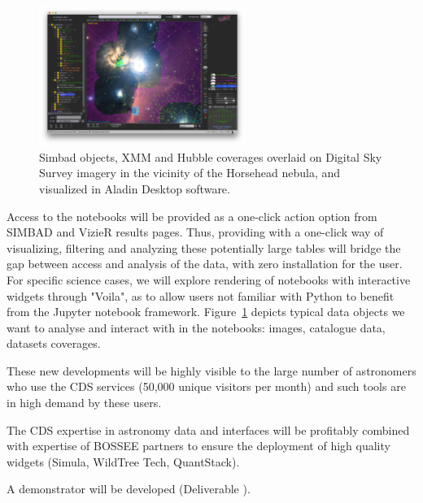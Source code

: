 \begin{task}[
  title=Astronomy application,
  id=astro,
  lead=CDS,
  PM=18,
  wphases={18-42},
  partners={QS,WTT,SRL,INSERM,XFEL}
]
\begin{figure}[ht!]\centering
  \includegraphics[width=0.6\textwidth]{astro-aladin-snapshot}
  \caption{Simbad objects, XMM and Hubble coverages overlaid on Digital Sky Survey imagery in the vicinity of the Horsehead nebula, and visualized in Aladin Desktop software.}\label{fig:astro-aladin-snapshot}
\end{figure}

  Access to the notebooks will be provided as a one-click action option from
  SIMBAD and VizieR results pages.
  Thus, providing with a one-click way of visualizing, filtering and analyzing
these potentially large tables will bridge the gap between access and analysis
of the data, with zero installation for the user.
  For specific science cases, we will explore rendering of notebooks with 
  interactive widgets through "Voila", as to allow users not familiar with 
  Python to benefit from the Jupyter notebook framework.
  Figure~\ref{fig:astro-aladin-snapshot} depicts typical data objects we want to analyse and interact with in the notebooks: images, catalogue data, datasets coverages.

  These new developments will be highly visible to the large number of astronomers who use the CDS services (50,000 unique visitors per month) and such tools are in high demand by these users.

  The CDS expertise in astronomy data and interfaces will be profitably combined with expertise of BOSSEE partners to ensure the deployment of high quality widgets (Simula, WildTree Tech, QuantStack).

  A demonstrator will be developed (Deliverable ).


\end{task}
